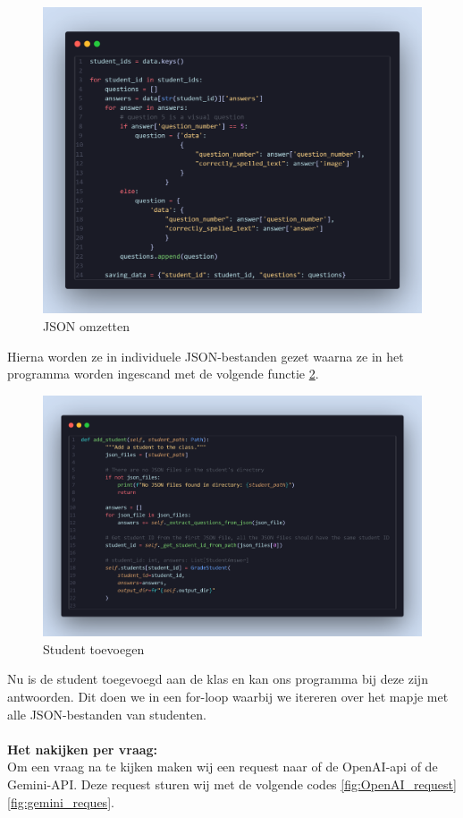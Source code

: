 \documentclass[12pt]{article}
\begin{document}
\begin{figure}[H] %
    \centering
    \includegraphics[width=0.8 \textwidth]{./images/methoden/nakijken/change_json.png}
    \caption{JSON omzetten}
    \label{fig:json_transformn}
\end{figure}
Hierna worden ze in individuele JSON-bestanden gezet waarna ze in het programma worden ingescand met de volgende functie \ref{fig:add_student}.
\begin{figure}[H] %
    \centering
    \includegraphics[width=0.9 \textwidth]{./images/methoden/nakijken/add_student.png}
    \caption{Student toevoegen}
    \label{fig:add_student}
\end{figure}
Nu is de student toegevoegd aan de klas en kan ons programma bij deze zijn antwoorden. Dit doen we in een for-loop waarbij we itereren over het mapje met alle JSON-bestanden van studenten.
\\ \\
\textbf{Het nakijken per vraag:} \\
Om een vraag na te kijken maken wij een request naar of de OpenAI-api of de Gemini-API. Deze request sturen wij met de volgende codes \ref{fig:OpenAI_request} \ref{fig:gemini_reques}.
\end{document}
